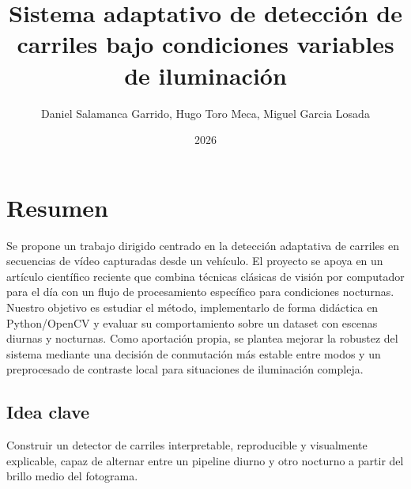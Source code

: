 \documentclass{article}
\title{Sistema adaptativo de detección de carriles bajo condiciones variables de iluminación}
\author{Daniel Salamanca Garrido, Hugo Toro Meca, Miguel Garcia Losada}
\date{2026}
\begin{document}
\maketitle

\section{Resumen}
Se propone un trabajo dirigido centrado en la detección adaptativa de carriles en secuencias de vídeo capturadas desde un vehículo. El proyecto se apoya en un artículo científico reciente que combina técnicas clásicas de visión por computador para el día con un flujo de procesamiento específico para condiciones nocturnas. Nuestro objetivo es estudiar el método, implementarlo de forma didáctica en Python/OpenCV y evaluar su comportamiento sobre un dataset con escenas diurnas y nocturnas. Como aportación propia, se plantea mejorar la robustez del sistema mediante una decisión de conmutación más estable entre modos y un preprocesado de contraste local para situaciones de iluminación compleja.

\subsection{Idea clave}
Construir un detector de carriles interpretable, reproducible y visualmente explicable, capaz de alternar entre un pipeline diurno y otro nocturno a partir del brillo medio del fotograma.
\end{document}
